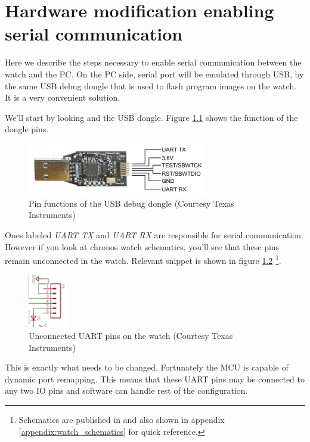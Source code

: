 \appendix
\chapter{Hardware modification enabling serial communication}
\label{appendix:uard_pins}

Here we describe the steps necessary to enable serial communication
between the watch and the PC. On the PC side, serial port will be
emulated through USB, by the same USB debug dongle that is used to
flash program images on the watch. It is a very convenient solution.

We'll start by looking and the USB dongle. Figure
\ref{fig:chronos_dongle_pins} shows the function of the dongle pins.
\begin{figure}[h]
  \centering
  \includegraphics[width=0.7\textwidth]{img/chronos_dongle_pins.png}
  \caption{Pin functions of the USB debug dongle (Courtesy Texas Instruments)}
  \label{fig:chronos_dongle_pins}
\end{figure}
Ones labeled \emph{UART TX} and \emph{UART RX} are responsible for
serial communication. However if you look at chronos watch schematics,
you'll see that these pins remain unconnected in the watch. Relevant
snippet is shown in figure \ref{fig:chronos_unonnected_uart}
\footnote{Schematics are published in \cite{eZ430Chronos} and also
shown in appendix \ref{appendix:watch_schematics} for quick
reference.}.
\begin{figure}[h]
  \centering
  \includegraphics[width=0.15\textwidth]{img/chronos_unonnected_uart.png}
  \caption{Unconnected UART pins on the watch (Courtesy Texas Instruments)}
  \label{fig:chronos_unonnected_uart}
\end{figure}
This is exactly what needs to be changed. Fortunately the MCU is
capable of dynamic port remapping. This means that these UART pins may
be connected to any two IO pins and software can handle rest of the
configuration.

